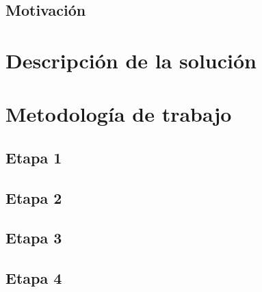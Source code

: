 \documentclass{udparticle}
\begin{document}
 




\subsection{Motivación}
 

\section{Descripción de la solución}
 

\section{Metodología de trabajo}
  \subsection{Etapa 1}
  \subsection{Etapa 2} 
  \subsection{Etapa 3}
  \subsection{Etapa 4}
 
\end{document}
